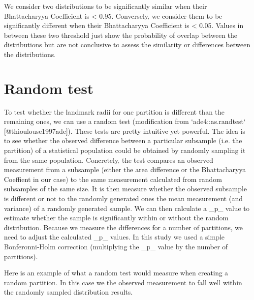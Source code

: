 \documentclass[a4paper,11pt]{article}
\begin{document}
We consider two distributions to be significantly similar when their Bhattacharyya Coefficient is < 0.95.
Conversely, we consider them to be significantly different when their Bhattacharyya Coefficient is < 0.05.
Values in between these two threshold just show the probability of overlap between the distributions but are not conclusive to assess the similarity or differences between the distributions.

\section{Random test}

To test whether the landmark radii for one partition is different than the remaining ones, we can use a random test (modification from `ade4::as.randtest` [@thioulouse1997ade]).
These tests are pretty intuitive yet powerful.
The idea is to see whether the observed difference between a particular subsample (i.e. the partition) of a statistical population could be obtained by randomly sampling it from the same population.
Concretely, the test compares an observed measurement from a subsample (either the area difference or the Bhattacharyya Coeffient in our case) to the same measurement calculated from random subsamples of the same size.
It is then measure whether the observed subsample is different or not to the randomly generated ones the mean measurement (and variance) of a randomly generated sample.
We can then calculate a _p_ value to estimate whether the sample is significantly within or without the random distribution.
Because we measure the differences for a number of partitions, we need to adjust the calculated _p_ values.
In this study we used a simple Bonferonni-Holm correction (multiplying the _p_ value by the number of partitions).

Here is an example of what a random test would measure when creating a random partition.
In this case we the observed measurement to fall well within the randomly sampled distribution results.
\end{document}
